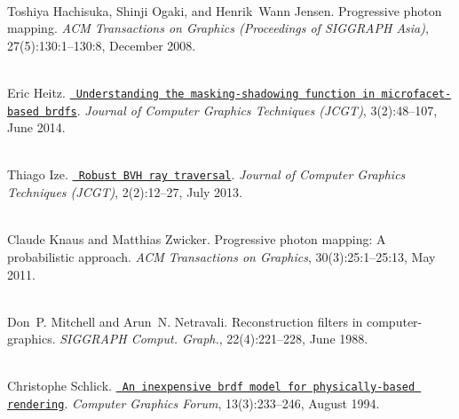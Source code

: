 \begin{DoxyDescription}
\item[\label{citelist_CITEREF_Hachisuka:2008:Progressive}%
\Hypertarget{citelist_CITEREF_Hachisuka:2008:Progressive}%
\mbox{[}7\mbox{]}]\hfill \\
Toshiya Hachisuka, Shinji Ogaki, and Henrik~Wann Jensen. Progressive photon mapping. {\itshape ACM Transactions on Graphics (Proceedings of SIGGRAPH Asia)}, 27(5)\+:130\+:1--130\+:8, December 2008. 


\item[\label{citelist_CITEREF_Heitz:2014:Microfacet}%
\Hypertarget{citelist_CITEREF_Heitz:2014:Microfacet}%
\mbox{[}8\mbox{]}]\hfill \\
Eric Heitz. \href{http://jcgt.org/published/0003/02/03/}{\texttt{ Understanding the masking-\/shadowing function in microfacet-\/based brdfs}}. {\itshape Journal of Computer Graphics Techniques (JCGT)}, 3(2)\+:48--107, June 2014.


\item[\label{citelist_CITEREF_Ize:2013:Robust}%
\Hypertarget{citelist_CITEREF_Ize:2013:Robust}%
\mbox{[}9\mbox{]}]\hfill \\
Thiago Ize. \href{http://jcgt.org/published/0002/02/02/}{\texttt{ Robust BVH ray traversal}}. {\itshape Journal of Computer Graphics Techniques (JCGT)}, 2(2)\+:12--27, July 2013.


\item[\label{citelist_CITEREF_Knaus:2011:Progressive}%
\Hypertarget{citelist_CITEREF_Knaus:2011:Progressive}%
\mbox{[}10\mbox{]}]\hfill \\
Claude Knaus and Matthias Zwicker. Progressive photon mapping\+: A probabilistic approach. {\itshape ACM Transactions on Graphics}, 30(3)\+:25\+:1--25\+:13, May 2011. 


\item[\label{citelist_CITEREF_Mitchell:1988:Reconstruction}%
\Hypertarget{citelist_CITEREF_Mitchell:1988:Reconstruction}%
\mbox{[}11\mbox{]}]\hfill \\
Don~P. Mitchell and Arun~N. Netravali. Reconstruction filters in computer-\/graphics. {\itshape SIGGRAPH Comput. Graph.}, 22(4)\+:221--228, June 1988. 


\item[\label{citelist_CITEREF_Schlick:1994:BRDF}%
\Hypertarget{citelist_CITEREF_Schlick:1994:BRDF}%
\mbox{[}12\mbox{]}]\hfill \\
Christophe Schlick. \href{https://onlinelibrary.wiley.com/doi/abs/10.1111/1467-8659.1330233}{\texttt{ An inexpensive brdf model for physically-\/based rendering}}. {\itshape Computer Graphics Forum}, 13(3)\+:233--246, August 1994. 



\end{DoxyDescription}
